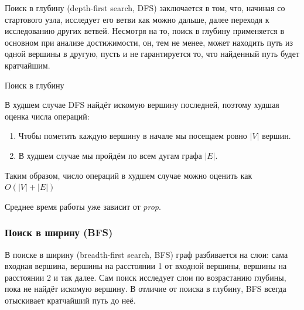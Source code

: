 Поиск в глубину (depth-first search, DFS) заключается в том, что, начиная со стартового узла, исследует его ветви как можно дальше, далее переходя к исследованию других ветвей. Несмотря на то, поиск в глубину применяется в основном при анализе достижимости, он, тем не менее, может находить путь из одной вершины в другую, пусть и не гарантируется то, что найденный путь будет кратчайшим.

\begin{algorithm}[H]
\SetAlgoLined
{}

\caption{Поиск в глубину}
\label{algo:DFS}
\end{algorithm}

В худшем случае DFS найдёт искомую вершину последней, поэтому худшая оценка числа операций:
\begin{enumerate}
    \item Чтобы пометить каждую вершину в начале мы посещаем ровно $|V|$ вершин.
    \item В худшем случае мы пройдём по всем дугам графа $|E|$.
\end{enumerate}

Таким образом, число операций в худшем случае можно оценить как $O(|V| + |E|)$

Среднее время работы уже зависит от \textit{prop}.

\subsubsection{Поиск в ширину (BFS)} \label{BFS-algo}

В поиске в ширину (breadth-first search, BFS) граф разбивается на слои: сама входная вершина, вершины на расстоянии 1 от входной вершины, вершины на расстоянии 2 и так далее. Сам поиск исследует слои по возрастанию глубины, пока не найдёт искомую вершину. В отличие от поиска в глубину, BFS всегда отыскивает кратчайший путь до неё.

